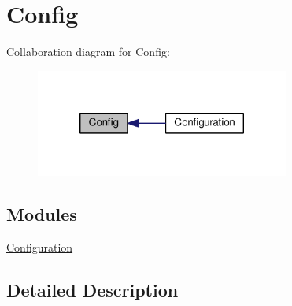 \hypertarget{group__Config}{\section{Config}
\label{group__Config}
}
Collaboration diagram for Config\+:\nopagebreak
\begin{figure}[H]
\begin{center}
\leavevmode
\includegraphics[width=236pt]{group__Config}
\end{center}
\end{figure}
\subsection*{Modules}
\begin{DoxyCompactItemize}
\item 
\hyperlink{group__config}{Configuration}
\end{DoxyCompactItemize}


\subsection{Detailed Description}
